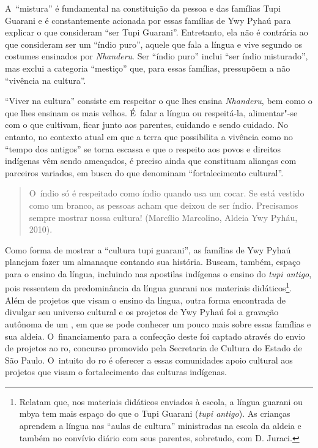 A~``mistura'' é fundamental na constituição da pessoa e das famílias Tupi
Guarani e é constantemente acionada por essas famílias de Ywy Pyhaú
para explicar o que consideram ``ser Tupi Guarani''. Entretanto, ela não é
contrária ao que consideram ser um ``índio puro'', aquele que fala a língua
e vive segundo os costumes ensinados por \emph{Nhanderu}. Ser ``índio puro''
inclui ``ser índio misturado'', mas exclui a categoria ``mestiço'' que, para
essas famílias, pressupõem a não ``vivência na cultura''.

``Viver na cultura'' consiste em respeitar o que lhes ensina \emph{Nhanderu}, bem
como o que lhes ensinam os mais velhos. É~falar a língua ou
respeitá-la, alimentar"-se com o que cultivam, ficar junto aos parentes,
cuidando e sendo cuidado. No entanto, no contexto atual em que a terra
que possibilita a vivência como no ``tempo dos antigos'' se torna escassa e
que o respeito aos povos e direitos indígenas vêm sendo ameaçados, é
preciso ainda que constituam alianças com parceiros variados, em busca
do que denominam ``fortalecimento cultural''. 

\begin{quote}
\noindent
O~índio só é respeitado como índio quando usa um cocar. Se está vestido
como um branco, as pessoas acham que deixou de ser índio. Precisamos
sempre mostrar nossa cultura! (Marcílio Marcolino, Aldeia Ywy Pyháu,
2010).
\end{quote}

Como forma de mostrar a ``cultura tupi guarani'', as famílias de Ywy Pyhaú
planejam fazer um almanaque contando sua história. Buscam, também,
espaço para o ensino da língua, incluindo nas apostilas indígenas o
ensino do \emph{tupi antigo}, pois ressentem da predominância da língua
guarani nos materiais didáticos\footnote{Relatam que, nos materiais
didáticos enviados à escola, a língua guarani ou mbya tem mais espaço
do que o Tupi Guarani (\emph{tupi antigo}). As crianças aprendem a língua nas
``aulas de cultura'' ministradas na escola da aldeia e também no convívio
diário com seus parentes, sobretudo, com D. Juraci.}. Além de projetos
que visam o ensino da língua, outra forma encontrada de divulgar seu
universo cultural e os projetos de Ywy Pyhaú foi a gravação autônoma de
um , em que se pode conhecer um pouco mais sobre essas famílias e
sua aldeia. O~financiamento para a confecção deste  foi captado
através do envio de projetos ao ro, concurso promovido pela
Secretaria de Cultura do Estado de São Paulo. O~intuito do ro é
oferecer a essas comunidades apoio cultural aos projetos que visam o
fortalecimento das culturas indígenas. 

